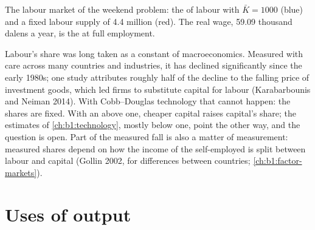 \begin{omfigure}

{\small The labour market of the weekend problem: the  of
labour with $\bar K = 1000$ (blue) and a fixed labour supply of 4.4 million (red).
The real wage, 59.09 thousand dalens a year, is the  at full
employment.}
\end{omfigure}

\begin{record}
Labour's share was long taken as a constant of macroeconomics. Measured
with care across many countries and industries, it has declined
significantly since the early 1980s; one study attributes roughly half of
the decline to the falling price of investment goods, which led firms to
substitute capital for labour (Karabarbounis and Neiman 2014).
With Cobb--Douglas technology that cannot happen: the shares are fixed. With
an  above one, cheaper capital raises capital's
share; the estimates of \cref{ch:b1:technology}, mostly below one, point the
other way, and the question is open. Part of the measured fall is also a
matter of measurement: measured shares depend on how the income of the
self-employed is split between labour and capital (Gollin 2002, for
differences between countries; \cref{ch:b1:factor-markets}). %
\end{record}

\section{Uses of output}\label{sec:b1:long-run-model:uses}


